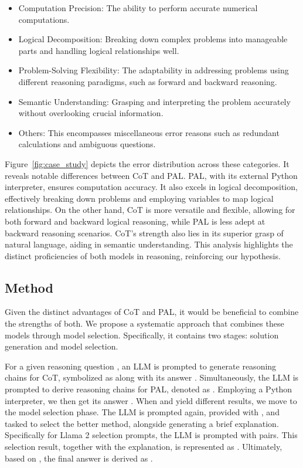 \documentclass[11pt]{article}
\begin{document}
\begin{itemize}
    \item Computation Precision: The ability to perform accurate numerical computations.
    \item Logical Decomposition: Breaking down complex problems into manageable parts and handling logical relationships well. 
    \item Problem-Solving Flexibility: The adaptability in addressing problems using different reasoning paradigms, such as forward and backward reasoning. 
    \item Semantic Understanding: Grasping and interpreting the problem accurately without overlooking crucial information.
    \item Others: This encompasses miscellaneous error reasons such as redundant calculations and ambiguous questions. 
\end{itemize}

Figure~\ref{fig:case_study} depicts the error distribution across these categories. It reveals notable differences between CoT and PAL. PAL, with its external Python interpreter, ensures computation accuracy. It also excels in logical decomposition, effectively breaking down problems and employing variables to map logical relationships. On the other hand, CoT is more versatile and flexible, allowing for both forward and backward logical reasoning, while PAL is less adept at backward reasoning scenarios. CoT's strength also lies in its superior grasp of natural language, aiding in semantic understanding. This analysis highlights the distinct proficiencies of both models in reasoning, reinforcing our hypothesis.

\subsection{Method}
Given the distinct advantages of CoT and PAL, it would be beneficial to combine the strengths of both. We propose a systematic approach that combines these models through model selection. Specifically, it contains two stages: solution generation and model selection.

For a given reasoning question , an LLM is prompted to generate reasoning chains for CoT, symbolized as  along with its answer . Simultaneously, the LLM is prompted to derive reasoning chains for PAL, denoted as . Employing a Python interpreter, we then get its answer . When  and  yield different results, we move to the model selection phase. The LLM is prompted again, provided with , and tasked to select the better method, alongside generating a brief explanation. Specifically for Llama 2 selection prompts, the LLM is prompted with  pairs. This selection result, together with the explanation, is represented as . Ultimately, based on , the final answer is derived as .
\end{document}
